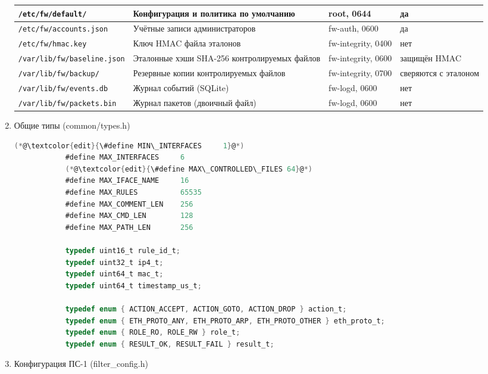 \documentclass[13pt,a4paper,final]{article}
\begin{document}
\begin{enumerate}
{\begin{xltabular}{\linewidth}{|p{4.3cm}|X|p{3cm}|p{2.1cm}|}
			\hline
			\texttt{/etc/fw/default/} & Конфигурация и политика по умолчанию & root, 0644 & да \\
			\hline
			\texttt{/etc/fw/}\newline\texttt{accounts.json} & Учётные записи администраторов & fw-auth, 0600 & да \\
			\hline
			\texttt{/etc/fw/hmac.key} & Ключ HMAC файла эталонов & fw-integrity, 0400 & нет \\
			\hline
			\texttt{/var/lib/fw/}\newline\texttt{baseline.json} & Эталонные хэши SHA-256 контролируемых файлов & fw-integrity, 0600 & защищён HMAC \\
			\hline
			\texttt{/var/lib/fw/backup/} & Резервные копии контролируемых файлов & fw-integrity, 0700 & сверяются с эталоном \\
			\hline
			\texttt{/var/lib/fw/}\newline\texttt{events.db} & Журнал событий (SQLite) & fw-logd, 0600 & нет \\
			\hline
			\texttt{/var/lib/fw/}\newline\texttt{packets.bin} & Журнал пакетов (двоичный файл) & fw-logd, 0600 & нет \\
			\hline
		\end{xltabular}
		}
		
		\item{Общие типы (common/types.h)}
		
		\begin{lstlisting}[language=C, caption={Общие типы}]
			(*@\textcolor{edit}{\#define MIN\_INTERFACES     1}@*)
			#define MAX_INTERFACES     6
			(*@\textcolor{edit}{\#define MAX\_CONTROLLED\_FILES 64}@*)
			#define MAX_IFACE_NAME     16
			#define MAX_RULES          65535
			#define MAX_COMMENT_LEN    256
			#define MAX_CMD_LEN        128
			#define MAX_PATH_LEN       256
			
			typedef uint16_t rule_id_t;
			typedef uint32_t ip4_t;
			typedef uint64_t mac_t;
			typedef uint64_t timestamp_us_t;
			
			typedef enum { ACTION_ACCEPT, ACTION_GOTO, ACTION_DROP } action_t;
			typedef enum { ETH_PROTO_ANY, ETH_PROTO_ARP, ETH_PROTO_OTHER } eth_proto_t;
			typedef enum { ROLE_RO, ROLE_RW } role_t;
			typedef enum { RESULT_OK, RESULT_FAIL } result_t;
		\end{lstlisting}
		
		\item{Конфигурация ПС-1 (filter\_config.h)}
		

\end{enumerate}
\end{document}
